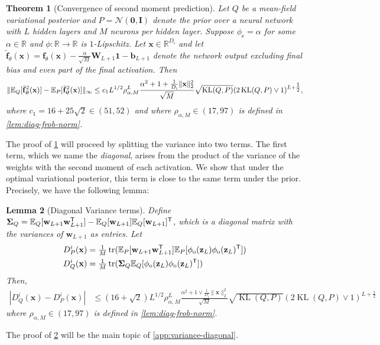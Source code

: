 \documentclass[twoside]{article}
\renewcommand{\ss}[1]{_{\text{#1}}}
\newcommand{\vnull}{\mathbf{0}}
\newcommand{\vb}{\mathbf{b}}
\newcommand{\vf}{\mathbf{f}}
\newcommand{\vw}{\mathbf{w}}
\newcommand{\vx}{\mathbf{x}}
\newcommand{\vz}{\mathbf{z}}
\newcommand{\vtheta}{\bm{\uptheta}}
\newcommand{\vone}{\mathbf{1}}
\newcommand{\mI}{\mathbf{I}}
\newcommand{\mW}{\mathbf{W}}
\newcommand{\mSigma}{\mathbf{\Sigma}}
\newcommand{\E}{\mathbb{E}}
\renewcommand{\P}{\mathbb{P}}
\newcommand{\Q}{\mathbb{Q}}
\renewcommand{\Q}{\ensuremath{Q}}
\renewcommand{\P}{\ensuremath{P}}
\newcommand{\R}{\mathbb{R}}
\newcommand{\T}{\text{\textsf{T}}}
\newcommand{\opspace}{}
\newcommand{\KL}{\operatorname{KL}}
\newcommand{\tr}{\operatorname{tr}\opspace}
\newcommand{\Normal}{\mathcal{N}}
\renewcommand{\ss}[1]{_{\text{#1}}}        %
\DeclarePairedDelimiter\norm{\|}{\|}             %
\theoremstyle{theoremstyle}
\newtheorem{theorem}{Theorem}
\newtheorem{lemma}[theorem]{Lemma}
\begin{document}
\begin{theorem}[Convergence of second moment prediction]\label{thm:app-convergence-of-variance}
    Let $Q$ be a mean-field variational posterior and $P=\Normal(\vnull,\mI)$ denote the prior over a neural network with $L$ hidden layers and $M$ neurons per hidden layer.
    Suppose $\phi\ss{e}=\alpha$ for some $\alpha \in \R$ and $\phi\colon \R \to \R$ is $1$-Lipschitz.
    Let $\vx \in \R^{D\ss{i}}$ and let $\widetilde{\vf}_{\theta}(\vx) = \vf_\theta(\vx) - \tfrac\alpha{\sqrt{M}}\mW_{L+1}\vone - \vb_{L+1}$ denote the network output excluding final bias and even part of the final activation. Then 
    \begin{equation}
        \norm{\E_Q[\tilde{\vf}_{\vtheta}^2(\vx)] - \E_P[\tilde{\vf}_{\vtheta}^2(\vx)]}_\infty
        \le
            c_1L^{1/2} \rho_{\alpha, M}^L
            \frac
                {\alpha^2 + 1 + \tfrac1{D\ss{i}}\norm{\vx}_2^2}
                {\sqrt{M}}  
            \sqrt{\KL(\Q, \P)} (2\KL(\Q, \P) \lor 1)^{L+\tfrac12},
    \end{equation}
    where $c_1 = 16 + 25\sqrt{2} \in (51, 52)$ and where $\rho_{\alpha, M} \in (17, 97)$ is defined in \cref{lem:diag-frob-norm}.
\end{theorem}

The proof of \cref{thm:app-convergence-of-variance} will proceed by splitting the variance into two terms. The first term, which we name the \textit{diagonal}, arises from the product of the variance of the weights with the second moment of each activation. We show that under the optimal variational posterior, this term is close to the same term under the prior. Precisely, we have the following lemma:
\begin{lemma}[Diagonal Variance terms]\label{lem:app-diagonal-variance}
Define $\mSigma_{Q} =\E_{\Q}[\vw_{L+1}\vw_{L+1}^\T] -  \E_{\Q}[\vw_{L+1}]\E_{\Q}[\vw_{L+1}]^\T$, which is a diagonal matrix with the variances of $\vw_{L+1}$ as entries. Let 
\begin{align}
    D^i_\P(\vx) &= \tfrac{1}{M}\tr(\E_{\P}[\vw_{L+1}\vw_{L+1}^\T]\E_{\P}[\phi\ss{o}(\vz_{L})\phi\ss{o}(\vz_{L})^\T])\\
        D^i_\Q(\vx) &=\tfrac{1}{M}\tr(\mSigma_{Q}\E_{\Q}[\phi\ss{o}(\vz_{L})\phi\ss{o}(\vz_{L})^\T])
\end{align}
Then,
\begin{align}
    |D^{i}_{\Q}(\vx) - D^{i}_{\P}(\vx)| 
    &\leq  
    \left(16 + \sqrt{2}\right) L^{1/2}
    \rho_{\alpha, M}^{L}\frac{\alpha^2 + 1\lor \tfrac1{D\ss{i}}\|\vx\|^2_2}{\sqrt{M}}  \sqrt{\KL(\Q,\P)} (2 \KL(\Q,\P) \lor 1)^{L+\tfrac12}
\end{align}
where $\rho_{\alpha, M} \in (17, 97)$ is defined in \cref{lem:diag-frob-norm}.
\end{lemma}
The proof of \cref{lem:app-diagonal-variance} will be the main topic of \cref{app:variance-diagonal}.
\end{document}
